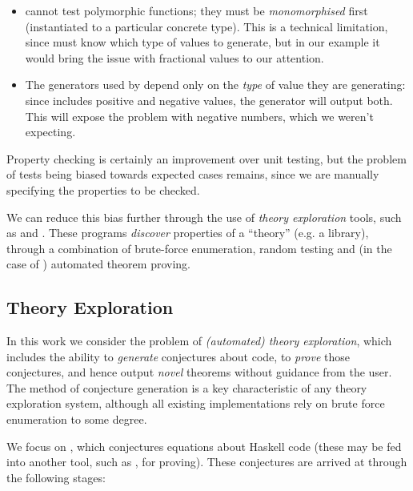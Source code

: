 \begin{itemize}
  \item \qcheck{} cannot test polymorphic functions; they must be \emph{monomorphised} first (instantiated to a particular concrete type). This is a technical limitation, since \qcheck{} must know which type of values to generate, but in our example it would bring the issue with fractional values to our attention.

  \item The generators used by \qcheck{} depend only on the \emph{type} of value they are generating: since  includes positive and negative values, the  generator will output both. This will expose the problem with negative numbers, which we weren't expecting.
\end{itemize}

Property checking is certainly an improvement over unit testing, but the problem of tests being biased towards expected cases remains, since we are manually specifying the properties to be checked.

We can reduce this bias further through the use of \emph{theory exploration} tools, such as \qspec{} and \hspec{}. These programs \emph{discover} properties of a ``theory'' (e.g. a library), through a combination of brute-force enumeration, random testing and (in the case of \hspec{}) automated theorem proving.

\subsection{Theory Exploration}
\label{sec:theoryexploration}

In this work we consider the problem of \emph{(automated) theory exploration}, which includes the ability to \emph{generate} conjectures about code, to \emph{prove} those conjectures, and hence output \emph{novel} theorems without guidance from the user. The method of conjecture generation is a key characteristic of any theory exploration system, although all existing implementations rely on brute force enumeration to some degree.

We focus on \qspec{} \citep{QuickSpec}, which conjectures equations about Haskell code (these may be fed into another tool, such as \hspec{}, for proving). These conjectures are arrived at through the following stages:

